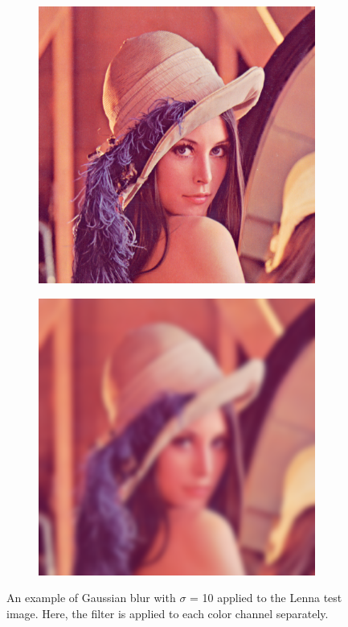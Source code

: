 \documentclass [12pt,a4paper]{report}
\begin{document}
\begin{center}
\begin{figure}[h]
\begin{subfigure}{.5\textwidth}
  \centering
  \includegraphics[scale=0.3]{Lenna.eps} %
\end{subfigure}%
\begin{subfigure}{.5\textwidth}
  \centering
  \includegraphics[scale=0.3]{Lenna_gaussian_10px.eps} %
\end{subfigure}
\caption{An example of Gaussian blur with $\sigma$ = 10 applied to the Lenna test image. Here, the filter is applied to each color channel separately.}
\label{fig_gaussian_blur}
\end{figure}
\end{center}
\end{document}
